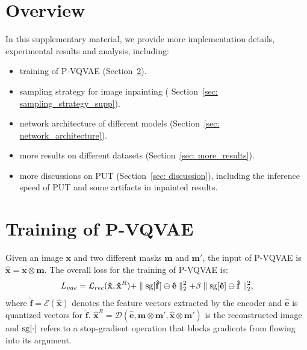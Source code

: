 \documentclass[10pt,twocolumn,letterpaper]{article}
\newcommand{\Sref}[1]{Section~\ref{#1}}
\begin{document}
\section{Overview}
In this supplementary material, we provide more implementation details, experimental results and analysis, including:
\begin{itemize}
    \item training of P-VQVAE (\Sref{sec: traning_of_p_vqvae}).
    \item sampling strategy for image inpainting ( \Sref{sec: sampling_strategy_supp}).
    \item network architecture of different models (\Sref{sec: network_architecture}).
    \item more results on different datasets (\Sref{sec: more_results}). 
    
    \item more discussions on PUT (\Sref{sec: discussion}), including 
    the inference speed of PUT and some artifacts in inpainted results.
    
\end{itemize}


\section{Training of P-VQVAE}
\label{sec: traning_of_p_vqvae}
Given an image $\mathbf{x}$ and two different masks $\mathbf{m}$ and $\mathbf{m'}$, the input of P-VQVAE is $\mathbf{\hat{x}}= \mathbf{x} \otimes \mathbf{m}$. The overall loss for the training of P-VQVAE is:
\begin{equation}
\begin{aligned}
     L_{vae}= \mathcal{L}_{rec}(\mathbf{\hat{x}}, \mathbf{\hat{x}}^R) 
	 + \parallel {\rm sg}[\mathbf{\hat{f}}] \ominus \mathbf{\hat{e}} \parallel^2_2 
	 + \beta \parallel {\rm sg}[\mathbf{\hat{e}}] \ominus \mathbf{\hat{f}} \parallel^2_2,
\end{aligned}
\label{eq: p_vqvae_loss}
\end{equation}
where  $\mathbf{\hat{f}}=\mathcal{E}(\mathbf{\hat{x}})$ denotes the feature vectors extracted by the encoder and $\mathbf{\hat{e}}$ is quantized vectors for $\mathbf{\hat{f}}$.  $\mathbf{\hat{x}}^R = \mathcal{D}(\mathbf{\hat{e}}, \mathbf{m} \otimes \mathbf{m'}, \mathbf{\hat{x}}\otimes \mathbf{m'})$ is the reconstructed image and ${\rm sg}[\cdot]$ refers to a stop-gradient operation that blocks gradients from flowing into its argument. 
\end{document}
